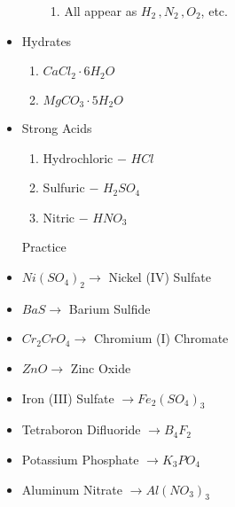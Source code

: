 \documentclass[12pt]{article}
\begin{document}
\begin{itemize}
\begin{enumerate}
    \begin{enumerate}

      \item All appear as $H_2\,,N_2\,,O_2$, etc.

    \end{enumerate}

  \end{enumerate}

  \item Hydrates

    \begin{enumerate}

      \item $CaCl_2\cdot6H_2O$

      \item $MgCO_3\cdot5H_2O$

    \end{enumerate}

  \item Strong Acids

    \begin{enumerate}

      \item Hydrochloric $-$ $HCl$

      \item Sulfuric $-$ $H_2SO_4$

      \item Nitric $-$ $HNO_3$

    \end{enumerate}

    \begin{center} Practice \end{center}

  \item $Ni(SO_4)_2 \rightarrow$ Nickel (IV) Sulfate

  \item $BaS \rightarrow$ Barium Sulfide

  \item $Cr_2CrO_4 \rightarrow$ Chromium (I) Chromate

  \item $ZnO \rightarrow$ Zinc Oxide

  \item Iron (III) Sulfate $\rightarrow Fe_2(SO_4)_3$

  \item Tetraboron Difluoride $\rightarrow B_4F_2$

  \item Potassium Phosphate $\rightarrow K_3PO_4$

  \item Aluminum Nitrate $\rightarrow Al(NO_3)_3$

\end{itemize}
\end{document}
